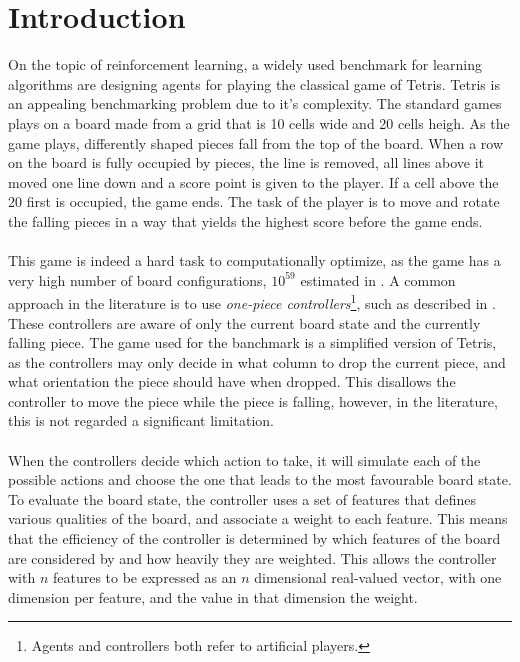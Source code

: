 \section{Introduction \label{sec:intro}}

On the topic of reinforcement learning, a widely used benchmark
for learning algorithms are designing agents 
for playing the classical game of Tetris. Tetris is an 
appealing benchmarking problem due to it's complexity. The 
standard games plays on a board made from a grid that is
10 cells wide and 20 cells heigh. As the game plays, differently
shaped pieces fall from the top of the board. 
When a row on the board is fully occupied by pieces, the line
is removed, all lines above it moved one line down and a score
point is given to the player. If a cell above the 20 first is
occupied, the game ends. The task of the player is to move
and rotate the falling pieces in a way that yields the highest 
score before the game ends.\\
\\
This game is indeed a hard task to computationally optimize, as
the game has a very high number of board configurations, 
$10^{59}$ estimated in \cite{scherrer2009}. A common approach 
in the literature is to use 
\textit{one-piece controllers}\footnote{Agents and controllers
both refer to artificial players.}, such as described in 
\cite{scherrer2009:b}. These controllers are aware of only 
the current board state and the currently falling piece. The 
game used for the banchmark is a simplified version of Tetris,
as the 
controllers may only decide in what column to drop the current
piece, and what orientation the piece should have when dropped.
This disallows the controller to move the piece while 
the piece is falling, however, in the literature, this 
is not regarded a significant limitation.\\
\\
When the controllers decide which action to take, it will
simulate each of the possible actions and choose the one that
leads to the most favourable board state. To evaluate the board 
state, the controller uses a set of features that defines 
various qualities of the board, and associate a weight to each 
feature. This means that the efficiency of the controller 
is determined by which features of the board are considered by
and how heavily they are weighted. This allows
the controller with $n$ features to be expressed as an 
$n$ dimensional real-valued vector, with one dimension 
per feature, and the value in that dimension the weight.


